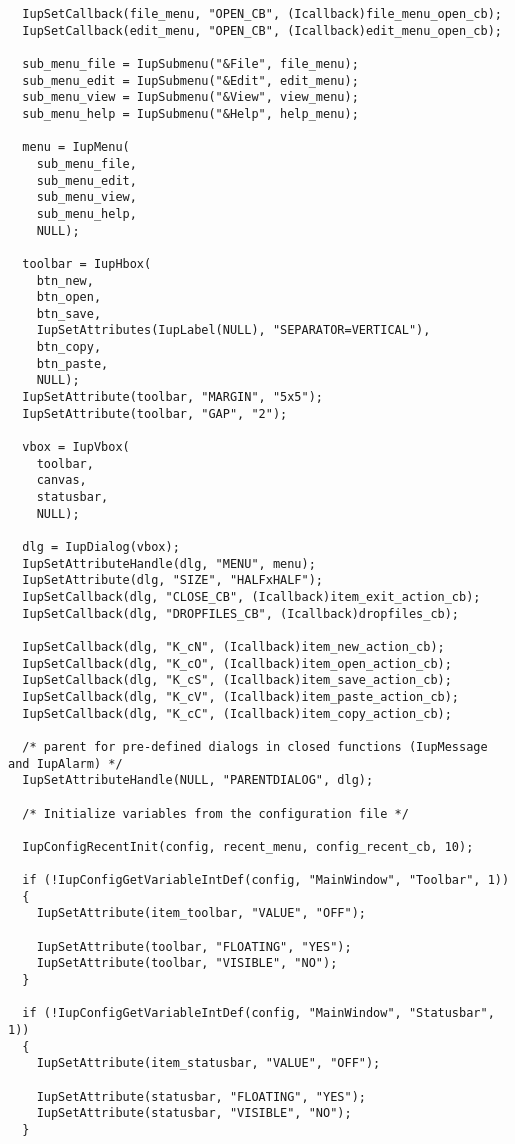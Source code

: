 \documentclass{ctexart}
\begin{document}
\begin{lstlisting}
  IupSetCallback(file_menu, "OPEN_CB", (Icallback)file_menu_open_cb);
  IupSetCallback(edit_menu, "OPEN_CB", (Icallback)edit_menu_open_cb);

  sub_menu_file = IupSubmenu("&File", file_menu);
  sub_menu_edit = IupSubmenu("&Edit", edit_menu);
  sub_menu_view = IupSubmenu("&View", view_menu);
  sub_menu_help = IupSubmenu("&Help", help_menu);

  menu = IupMenu(
    sub_menu_file,
    sub_menu_edit,
    sub_menu_view,
    sub_menu_help,
    NULL);

  toolbar = IupHbox(
    btn_new,
    btn_open,
    btn_save,
    IupSetAttributes(IupLabel(NULL), "SEPARATOR=VERTICAL"),
    btn_copy,
    btn_paste,
    NULL);
  IupSetAttribute(toolbar, "MARGIN", "5x5");
  IupSetAttribute(toolbar, "GAP", "2");

  vbox = IupVbox(
    toolbar,
    canvas,
    statusbar,
    NULL);

  dlg = IupDialog(vbox);
  IupSetAttributeHandle(dlg, "MENU", menu);
  IupSetAttribute(dlg, "SIZE", "HALFxHALF");
  IupSetCallback(dlg, "CLOSE_CB", (Icallback)item_exit_action_cb);
  IupSetCallback(dlg, "DROPFILES_CB", (Icallback)dropfiles_cb);

  IupSetCallback(dlg, "K_cN", (Icallback)item_new_action_cb);
  IupSetCallback(dlg, "K_cO", (Icallback)item_open_action_cb);
  IupSetCallback(dlg, "K_cS", (Icallback)item_save_action_cb);
  IupSetCallback(dlg, "K_cV", (Icallback)item_paste_action_cb);
  IupSetCallback(dlg, "K_cC", (Icallback)item_copy_action_cb);

  /* parent for pre-defined dialogs in closed functions (IupMessage and IupAlarm) */
  IupSetAttributeHandle(NULL, "PARENTDIALOG", dlg);

  /* Initialize variables from the configuration file */

  IupConfigRecentInit(config, recent_menu, config_recent_cb, 10);

  if (!IupConfigGetVariableIntDef(config, "MainWindow", "Toolbar", 1))
  {
    IupSetAttribute(item_toolbar, "VALUE", "OFF");

    IupSetAttribute(toolbar, "FLOATING", "YES");
    IupSetAttribute(toolbar, "VISIBLE", "NO");
  }

  if (!IupConfigGetVariableIntDef(config, "MainWindow", "Statusbar", 1))
  {
    IupSetAttribute(item_statusbar, "VALUE", "OFF");

    IupSetAttribute(statusbar, "FLOATING", "YES");
    IupSetAttribute(statusbar, "VISIBLE", "NO");
  }


\end{lstlisting}
\end{document}

